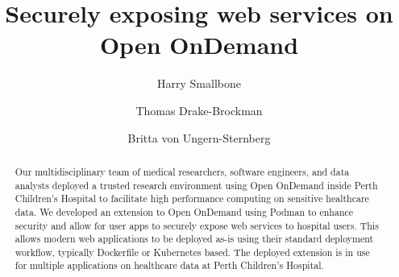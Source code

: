 \documentclass[sigconf,authordraft]{acmart}
\begin{document}
\title{Securely exposing web services on Open OnDemand}

\author{Harry Smallbone}

\author{Thomas Drake-Brockman}

\author{Britta von Ungern-Sternberg}


\begin{abstract}
  Our multidisciplinary team of medical researchers, software engineers, and data analysts deployed a trusted research environment using Open OnDemand inside Perth Children's Hospital to facilitate high performance computing on sensitive healthcare data. We developed an extension to Open OnDemand using Podman to enhance security and allow for user apps to securely expose web services to hospital users. This allows modern web applications to be deployed as-is using their standard deployment workflow, typically Dockerfile or Kubernetes based. The deployed extension is in use for multiple applications on healthcare data at Perth Children's Hospital.
\end{abstract}

\end{document}
